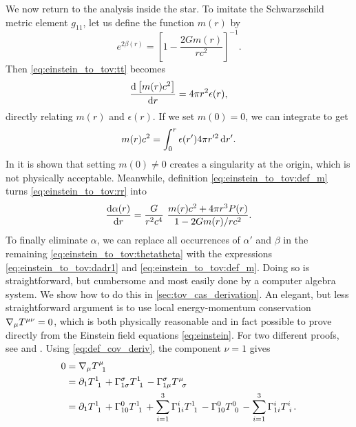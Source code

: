 We now return to the analysis inside the star.
To imitate the Schwarzschild metric element $g_{11}$, let us define the function $m(r)$ by
\begin{equation}
	e^{2 \beta(r)} = \left[ 1 - \frac{2 G m(r)}{r c^2} \right]^{-1} .
	\label{eq:einstein_to_tov:def_m}
\end{equation}
Then \cref{eq:einstein_to_tov:tt} becomes
\begin{equation}
	\odv{\left[m(r) c^2\right]}{r} = 4 \pi r^2 \epsilon(r) ,
	\label{eq:einstein_to_tov:m_rho}
\end{equation}
directly relating $m(r)$ and $\epsilon(r)$.
If we set $m(0) = 0$, we can integrate to get
\begin{equation}
	m(r) c^2 = \integral{\epsilon(r') 4 \pi r'^2}{r'}{0}{r} .
	\label{eq:einstein_to_tov:m_integral}
\end{equation}
In \cite[page 602]{ref:mtw} it is shown that setting $m(0) \neq 0$ creates a singularity at the origin, which is not physically acceptable.
Meanwhile, definition \eqref{eq:einstein_to_tov:def_m} turns \cref{eq:einstein_to_tov:rr} into
\begin{equation}
	\odv{\alpha(r)}{r} = \frac{G}{r^2 c^4} \frac{m(r) c^2 + 4 \pi r^3 P(r)}{1 - 2 G m(r) / r c^2} .
	\label{eq:einstein_to_tov:dadr1}
\end{equation}
To finally eliminate $\alpha$, we can replace all occurrences of $\alpha'$ and $\beta$ in the remaining \cref{eq:einstein_to_tov:thetatheta} with the expressions \eqref{eq:einstein_to_tov:dadr1} and \eqref{eq:einstein_to_tov:def_m}.
Doing so is straightforward, but cumbersome and most easily done by a computer algebra system.
We show how to do this in \cref{sec:tov_cas_derivation}.
An elegant, but less straightforward argument is to use local energy-momentum conservation $\nabla_\mu T\indices{^\mu^\nu} = 0$, which is both physically reasonable and in fact possible to prove directly from the Einstein field equations \eqref{eq:einstein}.
For two different proofs, see \cite{ref:einstein_conservation_energy_momentum} and \cite[section 8.3.2]{ref:mika_gr_notes}.
Using \cref{eq:def_cov_deriv}, the component $\nu=1$ gives
\begin{equation*}
\begin{split}
	0 &= \nabla_\mu T\indices{^\mu_1} \\
	  &= \partial_1 T\indices{^1_1} + \Gamma^\sigma_{1 \sigma} T\indices{^1_1} - \Gamma^\sigma_{1 \mu} T\indices{^\mu_\sigma} \\
	  &= \partial_1 T\indices{^1_1} + \Gamma^0_{10} T\indices{^1_1} + \sum_{i=1}^3 \Gamma^i_{1i} T\indices{^1_1} - \Gamma^0_{10} T\indices{^0_0} - \sum_{i=1}^3 \Gamma^i_{1i} T\indices{^i_i} . \\
\end{split}
\end{equation*}
